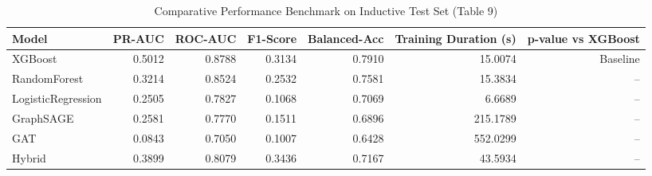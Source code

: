 \begin{table}
\caption{Comparative Performance Benchmark on Inductive Test Set (Table 9)}
\label{tab:overall_metrics}
\begin{tabular}{lrrrrrr}
\toprule
Model & PR-AUC & ROC-AUC & F1-Score & Balanced-Acc & Training Duration (s) & p-value vs XGBoost \\
\midrule
XGBoost & 0.5012 & 0.8788 & 0.3134 & 0.7910 & 15.0074 & Baseline \\
RandomForest & 0.3214 & 0.8524 & 0.2532 & 0.7581 & 15.3834 & -- \\
LogisticRegression & 0.2505 & 0.7827 & 0.1068 & 0.7069 & 6.6689 & -- \\
GraphSAGE & 0.2581 & 0.7770 & 0.1511 & 0.6896 & 215.1789 & -- \\
GAT & 0.0843 & 0.7050 & 0.1007 & 0.6428 & 552.0299 & -- \\
Hybrid & 0.3899 & 0.8079 & 0.3436 & 0.7167 & 43.5934 & -- \\
\bottomrule
\end{tabular}
\end{table}
